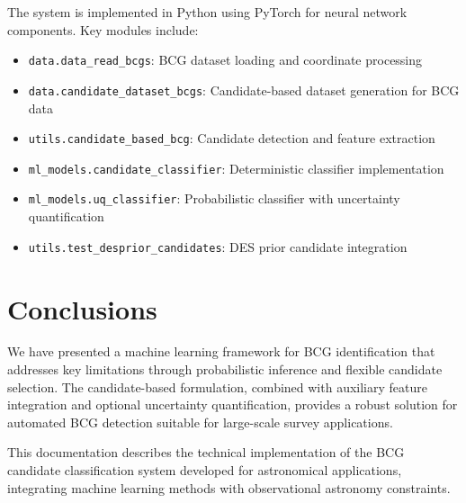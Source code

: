 \documentclass[twocolumn,10pt]{aastex631}
\begin{document}
The system is implemented in Python using PyTorch for neural network components. Key modules include:

\begin{itemize}
\item \texttt{data.data\_read\_bcgs}: BCG dataset loading and coordinate processing
\item \texttt{data.candidate\_dataset\_bcgs}: Candidate-based dataset generation for BCG data
\item \texttt{utils.candidate\_based\_bcg}: Candidate detection and feature extraction
\item \texttt{ml\_models.candidate\_classifier}: Deterministic classifier implementation
\item \texttt{ml\_models.uq\_classifier}: Probabilistic classifier with uncertainty quantification
\item \texttt{utils.test\_desprior\_candidates}: DES prior candidate integration
\end{itemize}

\section{Conclusions}

We have presented a machine learning framework for BCG identification that addresses key limitations through probabilistic inference and flexible candidate selection. The candidate-based formulation, combined with auxiliary feature integration and optional uncertainty quantification, provides a robust solution for automated BCG detection suitable for large-scale survey applications.

\acknowledgments
This documentation describes the technical implementation of the BCG candidate classification system developed for astronomical applications, integrating machine learning methods with observational astronomy constraints.
\end{document}
